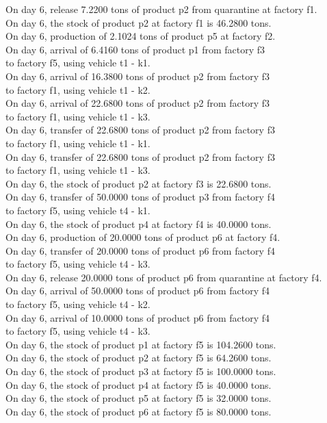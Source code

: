 \begin{tabbing}
On day 6, release 7.2200 tons of product p2 from quarantine at factory f1. \\
On day 6, the stock of product p2 at factory f1 is 46.2800 tons. \\
On day 6, production of 2.1024 tons of product p5 at factory f2. \\
On day 6, arrival of 6.4160 tons of product p1 from factory f3 \\ to factory f5, using vehicle t1 - k1. \\
On day 6, arrival of 16.3800 tons of product p2 from factory f3 \\ to factory f1, using vehicle t1 - k2. \\
On day 6, arrival of 22.6800 tons of product p2 from factory f3 \\ to factory f1, using vehicle t1 - k3. \\
On day 6, transfer of 22.6800 tons of product p2 from factory f3 \\ to factory f1, using vehicle t1 - k1. \\
On day 6, transfer of 22.6800 tons of product p2 from factory f3 \\ to factory f1, using vehicle t1 - k3. \\
On day 6, the stock of product p2 at factory f3 is 22.6800 tons. \\
On day 6, transfer of 50.0000 tons of product p3 from factory f4 \\ to factory f5, using vehicle t4 - k1. \\
On day 6, the stock of product p4 at factory f4 is 40.0000 tons. \\
On day 6, production of 20.0000 tons of product p6 at factory f4. \\
On day 6, transfer of 20.0000 tons of product p6 from factory f4 \\ to factory f5, using vehicle t4 - k3. \\
On day 6, release 20.0000 tons of product p6 from quarantine at factory f4. \\
On day 6, arrival of 50.0000 tons of product p6 from factory f4 \\ to factory f5, using vehicle t4 - k2. \\
On day 6, arrival of 10.0000 tons of product p6 from factory f4 \\ to factory f5, using vehicle t4 - k3. \\
On day 6, the stock of product p1 at factory f5 is 104.2600 tons. \\
On day 6, the stock of product p2 at factory f5 is 64.2600 tons. \\
On day 6, the stock of product p3 at factory f5 is 100.0000 tons. \\
On day 6, the stock of product p4 at factory f5 is 40.0000 tons. \\
On day 6, the stock of product p5 at factory f5 is 32.0000 tons. \\
On day 6, the stock of product p6 at factory f5 is 80.0000 tons. \\
\end{tabbing} 
